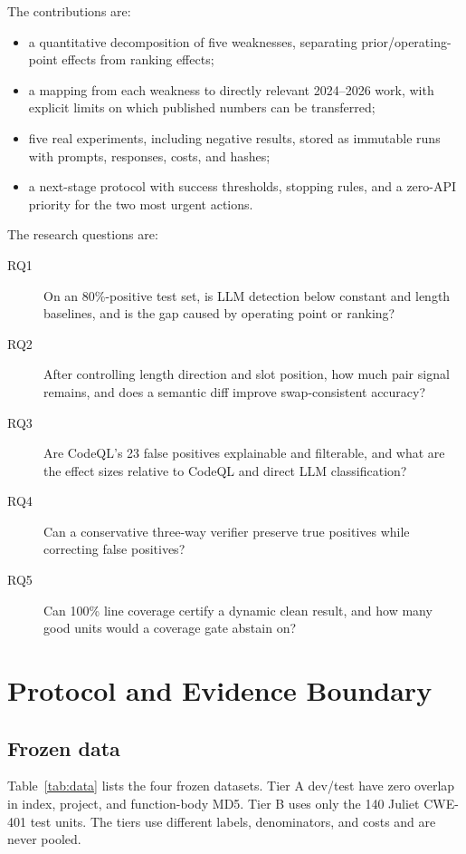 \documentclass[conference]{IEEEtran}
\begin{document}
The contributions are:
\begin{itemize}
  \item a quantitative decomposition of five weaknesses, separating prior/operating-point effects from ranking effects;
  \item a mapping from each weakness to directly relevant 2024--2026 work, with explicit limits on which published numbers can be transferred;
  \item five real experiments, including negative results, stored as immutable runs with prompts, responses, costs, and hashes;
  \item a next-stage protocol with success thresholds, stopping rules, and a zero-API priority for the two most urgent actions.
\end{itemize}

The research questions are:
\begin{description}
  \item[RQ1] On an 80\%-positive test set, is LLM detection below constant and length baselines, and is the gap caused by operating point or ranking?
  \item[RQ2] After controlling length direction and slot position, how much pair signal remains, and does a semantic diff improve swap-consistent accuracy?
  \item[RQ3] Are CodeQL's 23 false positives explainable and filterable, and what are the effect sizes relative to CodeQL and direct LLM classification?
  \item[RQ4] Can a conservative three-way verifier preserve true positives while correcting false positives?
  \item[RQ5] Can 100\% line coverage certify a dynamic clean result, and how many good units would a coverage gate abstain on?
\end{description}

\section{Protocol and Evidence Boundary}
\label{sec:protocol}

\subsection{Frozen data}
Table~\ref{tab:data} lists the four frozen datasets. Tier A dev/test have zero overlap in index, project, and function-body MD5. Tier B uses only the 140 Juliet CWE-401 test units. The tiers use different labels, denominators, and costs and are never pooled.
\end{document}
